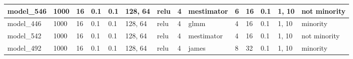 \begin{tabular}{|l|l|l|l|l|l|l|l|l|l|l|l|l|l|}
model\_546     & 1000           & 16           & 0.1          & 0.1          & 128, 64     & relu         & 4           & mestimator        & 6                    & 16                    & 0.1                        & 1, 10            & not minority                \\ \hline
model\_446     & 1000           & 16           & 0.1          & 0.1          & 128, 64     & relu         & 4           & glmm              & 4                    & 16                    & 0.1                        & 1, 10            & minority                    \\ \hline
model\_542     & 1000           & 16           & 0.1          & 0.1          & 128, 64     & relu         & 4           & mestimator        & 4                    & 16                    & 0.1                        & 1, 10            & not minority                \\ \hline
model\_492     & 1000           & 16           & 0.1          & 0.1          & 128, 64     & relu         & 4           & james             & 8                    & 32                    & 0.1                        & 1, 10            & minority                    \\ \hline
\end{tabular}